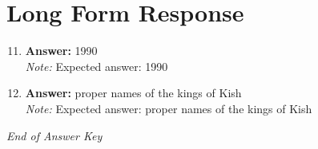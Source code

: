 \documentclass[12pt]{article}
\begin{document}
\section*{Long Form Response}
\begin{enumerate}[label=\arabic*.]
\setcounter{enumi}{10}
\item \textbf{Answer:} 1990
\\ \textit{Note:} Expected answer: 1990
\item \textbf{Answer:} proper names of the kings of Kish
\\ \textit{Note:} Expected answer: proper names of the kings of Kish
\end{enumerate}

\vfill
\noindent\textit{End of Answer Key}
\end{document}
